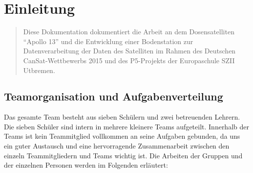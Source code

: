 \section{Einleitung}
\begin{abstract}
Diese Dokumentation dokumentiert die Arbeit an dem Dosensatelliten ``Apollo 13'' und die Entwicklung einer Bodenstation zur Datenverarbeitung der Daten des Satelliten im Rahmen des Deutschen CanSat-Wettbewerbs 2015 und des P5-Projekts der Europaschule SZII Utbremen.
\end{abstract}
\subsection{Teamorganisation und Aufgabenverteilung }

Das gesamte Team besteht aus sieben Schülern und zwei betreuenden Lehrern. Die sieben Schüler sind intern in mehrere kleinere Teams aufgeteilt. Innerhalb der Teams ist kein Teammitglied vollkommen an seine Aufgaben gebunden, da uns ein guter Austausch und eine hervorragende Zusammenarbeit zwischen den einzeln Teammitgliedern und Teams wichtig ist. Die Arbeiten der Gruppen und der einzelnen Personen werden im Folgenden erläutert:

